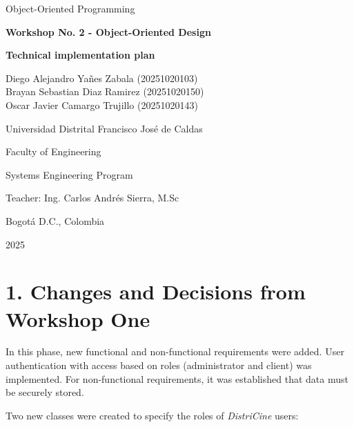 \documentclass[man]{apa7}
\begin{document}
\begin{titlepage}
    \centering
    \vspace*{1.5cm}
    {\Large Object-Oriented Programming \par}
    \vfill
    {\bfseries\LARGE Workshop No. 2 - Object-Oriented Design \par}
    {\bfseries\LARGE Technical implementation plan\par}
    \vfill
    {\large
        Diego Alejandro Yañes Zabala (20251020103) \\ 
        Brayan Sebastian Diaz Ramirez (20251020150) \\
        Oscar Javier Camargo Trujillo (20251020143) \par
    }
    \vfill
    {\Large Universidad Distrital Francisco José de Caldas \par}
    \vspace{1.5cm}
    {\large Faculty of Engineering \par}
    {\large Systems Engineering Program \par}
    {\large Teacher: Ing. Carlos Andrés Sierra, M.Sc \par}
    {\large Bogotá D.C., Colombia \par}
    {\large 2025 \par}
\end{titlepage}



\section{1. Changes and Decisions from Workshop One}

In this phase, new functional and non-functional requirements were added. User authentication with access based on roles (administrator and client) was implemented. For non-functional requirements, it was established that data must be securely stored.

Two new classes were created to specify the roles of \textit{DistriCine} users:
\end{document}
